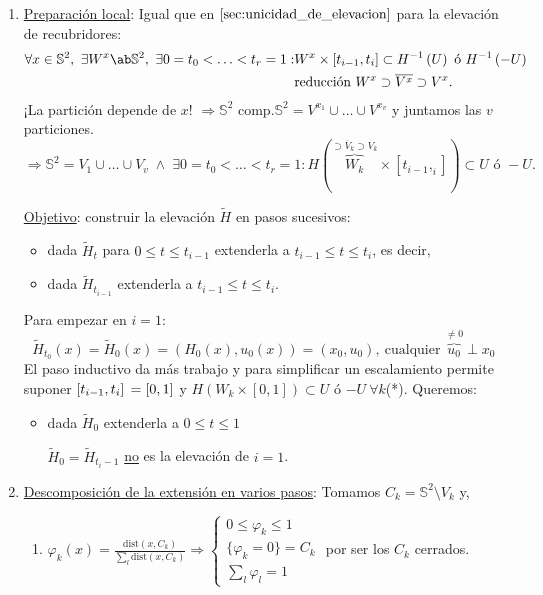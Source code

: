 \begin{demo}
\begin{enumerate}
    \item \underline{Preparación local}: Igual que en $\ref{sec:unicidad_de_elevacion}$ para la elevación de recubridores:
    \begin{align*}
        \forall x \in \mathbb{S}^{2},\ \exists W^x \ab \mathbb{S}^{2},\ \exists 0 = t_0 < \ldots < t_r = 1 : &W^x \times \left[ t_{i - 1}, t_i \right] \subset H^{-1}\left( U \right) \text{ ó } H^{-1}\left( -U \right)\\
        &\text{reducción } W^x \supset \overline{V^x} \supset V^x
    .\end{align*}
    ¡La partición depende de $x$! $\Rightarrow{\mathbb{S}^{2}\text{ comp.}} \mathbb{S}^{2} = V^{x_1} \cup \ldots \cup V^{x_v}$ y juntamos las $v$ particiones.
    \[
    \Rightarrow \mathbb{S}^{2} = V_1 \cup \ldots \cup V_v\; \land \;\exists 0 = t_0 < \ldots < t_r = 1: H\left( \overbrace{W_k}^{\supset \overline{V}_k \supset V_k} \times \left[ t_{i - 1}, _i \right] \right) \subset U \text{ ó } -U.
    \]

    \underline{Objetivo}: construir la elevación $\tilde{H}$ en pasos sucesivos: 
    \begin{itemize}
        \item dada $\tilde{H}_t$ para $0 \le t \le t_{i-1}$ extenderla a $t_{i - 1} \le t \le t_i$, es decir, 
        \item dada $\tilde{H}_{t_{i - 1}}$ extenderla a $t_{i - 1} \le t \le t_i$.
    \end{itemize}
    Para empezar en $i = 1$: 
    \[
    \tilde{H}_{t_0} \left( x \right) = \tilde{H}_0\left( x \right) = \left( H_0\left( x \right), u_0\left( x \right) \right) = \left( x_0, u_0 \right),\ \text{cualquier } \overbrace{u_0}^{\neq 0} \perp x_0
    \]
    El paso inductivo da más trabajo y para simplificar un escalamiento permite suponer $\left[ t_{i - 1}, t_i \right]\\ = \left[ 0, 1 \right]$ y $H\left( W_k \times \left[ 0, 1 \right] \right) \subset U$ ó $-U\ \forall k$(*). Queremos:
    \begin{itemize}
        \item dada $\tilde{H}_0$ extenderla a $0 \le t \le 1$
        \begin{demo}
            $\tilde{H}_0 = \tilde{H}_{t_i - 1}$ \underline{no} es la elevación de $i = 1$. 
        \end{demo}
    \end{itemize}

    \item \underline{Descomposición de la extensión en varios pasos}: Tomamos $C_k = \mathbb{S}^{2} \setminus V_k$ y,
    \begin{enumerate}
        \item $\varphi_k\left( x \right) = \frac{\mathrm{dist} \left( x, C_k \right)}{\sum_{l} \mathrm{dist} \left( x, C_k \right)} \Rightarrow \begin{cases}
            0 \le \varphi_k \le 1\\
            \{\varphi_k = 0\} = C_k\\
            \sum_{l} \varphi_l = 1 
        \end{cases}$ por ser los $C_k$ cerrados.


\end{enumerate}
\end{enumerate}
\end{demo}

